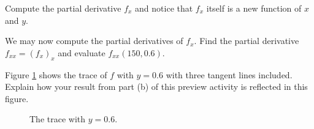 \begin{pa}
  \ba
  \item Compute the partial derivative $f_x$ and notice that $f_x$ itself is a
    new function of $x$ and $y$.
  \item We may now compute the partial derivatives of $f_x$.  Find the
    partial derivative $f_{xx} = (f_x)_x$ and evaluate $f_{xx}(150,
    0.6)$.  

  \item Figure \ref{F:10.3.preview.xx} shows the trace of $f$ with
    $y=0.6$ with three tangent lines included.  Explain how your
    result from part (b) of this preview activity is reflected in
    this figure.  

  \begin{figure}[ht]
    \begin{center}
    \end{center}
    \caption{The trace with $y=0.6$.}
    \label{F:10.3.preview.xx}
  \end{figure}

  


\end{pa}
